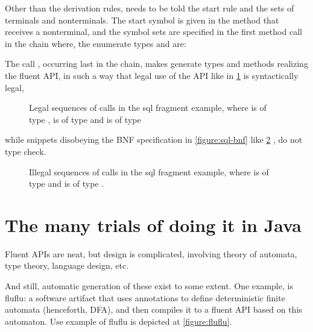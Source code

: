 Other than the derivation rules, \Fajita needs to be told the start rule 
  and the sets of terminals and nonterminals.
The start symbol is given in the  method that receives a nonterminal,
and the symbol sets are specified in the first method call in the chain where,
  the enumerate types  and  are:

\begin{quote}
\end{quote}

The call , occurring last in the chain, makes \Fajita generate types
and methods realizing the fluent API, in such a way that legal use of the API
like in \cref{figure:sql:legal} is syntactically legal,

\begin{figure}[H]
  \caption[Legal sequences of calls in the sql fragment example]{\label{figure:sql:legal}
  Legal sequences of calls in the sql fragment example,
  where  is of type ,  is of type  and 
  is of type }

\end{figure}

while snippets disobeying the BNF specification in \cref{figure:sql-bnf} like
\cref{figure:sql:illegal} , do not type check.

\begin{figure}[H]
  \caption[Illegal sequences of calls in the sql fragment example]{\label{figure:sql:illegal}
  Illegal sequences of calls in the sql fragment example,
  where  is of type  and  is of type .}
\end{figure}

\section{The many trials of doing it in Java}
Fluent APIs are neat, but design is complicated,
involving theory of automata, type theory, language design, etc.

And still, automatic generation of these exist to some extent.
One example, is fluflu: a software artifact that uses
\Java annotations to define deterministic finite automata (henceforth, DFA), and then
compiles it to a fluent API based on this automaton. Use example of fluflu is
depicted at \cref{figure:fluflu}.

